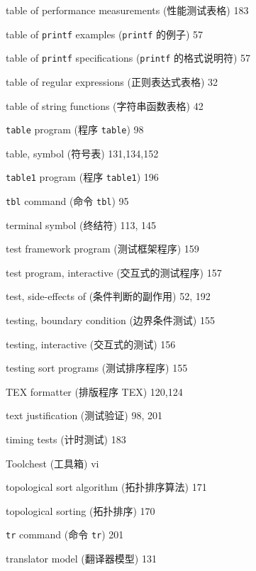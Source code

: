\begin{multicols}{2}
\hangindent=2pc  table of performance measurements (性能测试表格)
183

\hangindent=2pc  table of \verb'printf' examples (\verb'printf'
的例子) 57

\hangindent=2pc  table of \verb'printf' specifications
(\verb'printf' 的格式说明符) 57

\hangindent=2pc  table of regular expressions (正则表达式表格) 32

\hangindent=2pc  table of string functions (字符串函数表格) 42

\hangindent=2pc  \verb'table' program (程序 \verb'table') 98

\hangindent=2pc  table, symbol (符号表) 131,134,152

\hangindent=2pc  \verb'table1' program (程序 \verb'table1') 196

\hangindent=2pc  \verb'tbl' command (命令 \verb'tbl') 95

\hangindent=2pc  terminal symbol (终结符) 113, 145

\hangindent=2pc  test framework program (测试框架程序) 159

\hangindent=2pc  test program, interactive (交互式的测试程序) 157

\hangindent=2pc  test, side-effects of (条件判断的副作用) 52, 192

\hangindent=2pc  testing, boundary condition (边界条件测试) 155

\hangindent=2pc  testing, interactive (交互式的测试) 156

\hangindent=2pc  testing sort programs (测试排序程序) 155

\hangindent=2pc  TEX formatter (排版程序 TEX) 120,124

\hangindent=2pc  text justification (测试验证) 98, 201

\hangindent=2pc  timing tests (计时测试) 183

\hangindent=2pc  Toolchest (工具箱) vi

\hangindent=2pc  topological sort algorithm (拓扑排序算法) 171

\hangindent=2pc  topological sorting (拓扑排序) 170

\hangindent=2pc  \verb'tr' command (命令 \verb'tr') 201

\hangindent=2pc  translator model (翻译器模型) 131


\end{multicols}
